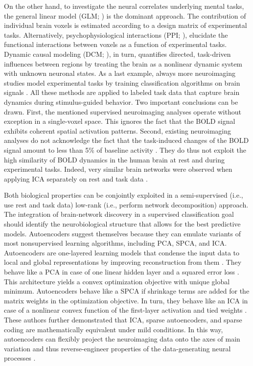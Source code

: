 \documentclass{article} %
\begin{document}
\linebreak

On the other hand, to investigate
the neural correlates underlying mental tasks,
the general linear model (GLM; \cite{friston94}) is the dominant approach.
The contribution of
individual brain voxels is estimated
according to a design matrix of experimental tasks.
Alternatively, psychophysiological interactions (PPI; \cite{friston97}),
elucidate the functional interactions between voxels as a function
of experimental tasks.
Dynamic causal modeling (DCM; \cite{stephan04}), in turn, quantifies directed,
task-driven influences between regions
by treating the brain as a nonlinear dynamic system with unknown
neuronal states. As a last example, always more neuroimaging studies model
experimental tasks by training classification algorithms on brain signals
\cite{poldrack09decoding}.
All these methods are applied to labeled task data that capture brain dynamics
during stimulus-guided behavior.
Two important conclusions can be drawn.
First, the mentioned supervised neuroimaging analyses operate
without exception in a single-voxel space. This ignores the fact that the BOLD
signal exhibits coherent spatial activation patterns.
Second, existing neuroimaging analyses do not acknowledge the fact that the
task-induced changes of the BOLD signal amount to less than 5\%
of baseline activity \cite{fox07}. They do thus not exploit the high similarity
of BOLD dynamics in the human brain at rest and during experimental tasks.
Indeed, very similar brain networks were observed when applying ICA
separately on rest and task data \cite{smith2009}.

\linebreak

Both biological properties can be conjointly exploited in a 
semi-supervised (i.e., use rest and task data)
low-rank (i.e., perform network decomposition)
approach.
%
The integration of brain-network discovery in a 
supervised classification goal should identify the
neurobiological structure that allows for the best predictive models.
%
Autoencoders suggest themselves because they can emulate
variants of most nonsupervised learning algorithms,
including PCA, SPCA, and ICA.
Autoencoders
are one-layered learning models that condense the input data to
local and global representations
by improving reconstruction from them \cite{hinton06}.
%
They behave like a PCA
in case of one linear hidden layer and a squared error loss
\cite{baldi1989neural}.
This architecture yields a convex optimization objective
with unique global minimum.
Autoencoders behave like a SPCA if shrinkage terms are added for the
matrix weights in the optimization objective.
In turn, they behave like an ICA in case of a nonlinear convex
function of the first-layer activation and tied weights \cite{le2011ica}.
These authors further demonstrated that ICA, sparse autoencoders, and 
sparse coding are mathematically equivalent
under mild conditions.
In this way, autoencoders can flexibly project the neuroimaging data
onto the axes of main variation and thus
reverse-engineer properties of the data-generating
neural processes \cite{olshausen96}.
\end{document}
